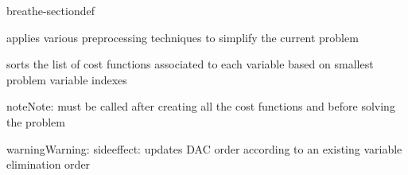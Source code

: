 \documentclass[letterpaper,10pt,openany,oneside,english]{sphinxmanual}
\begin{document}
\begin{fulllineitems}
\begin{sphinxuseclass}{breathe-sectiondef}
\begin{fulllineitems}
\label{\detokenize{ref/ref_cpp:_CPPv4N11WeightedCSP13preprocessingEv}}\label{\detokenize{ref/ref_cpp:_CPPv3N11WeightedCSP13preprocessingEv}}\label{\detokenize{ref/ref_cpp:_CPPv2N11WeightedCSP13preprocessingEv}}\label{\detokenize{ref/ref_cpp:WeightedCSP::preprocessing}}
\pysigstartsignatures
\pysigstartmultiline
{}
\pysigstopmultiline
\pysigstopsignatures
\sphinxAtStartPar
applies various preprocessing techniques to simplify the current problem 

\end{fulllineitems}


\begin{fulllineitems}
\label{\detokenize{ref/ref_cpp:_CPPv4N11WeightedCSP15sortConstraintsEv}}\label{\detokenize{ref/ref_cpp:_CPPv3N11WeightedCSP15sortConstraintsEv}}\label{\detokenize{ref/ref_cpp:_CPPv2N11WeightedCSP15sortConstraintsEv}}\label{\detokenize{ref/ref_cpp:WeightedCSP::sortConstraints}}
\pysigstartsignatures
\pysigstartmultiline
{}
\pysigstopmultiline
\pysigstopsignatures
\sphinxAtStartPar
sorts the list of cost functions associated to each variable based on smallest problem variable indexes 

\begin{sphinxadmonition}{note}{Note:}
\sphinxAtStartPar
must be called after creating all the cost functions and before solving the problem 
\end{sphinxadmonition}

\begin{sphinxadmonition}{warning}{Warning:}
\sphinxAtStartPar
side\sphinxhyphen{}effect: updates DAC order according to an existing variable elimination order 
\end{sphinxadmonition}


\end{fulllineitems}
\end{sphinxuseclass}
\end{fulllineitems}
\end{document}
